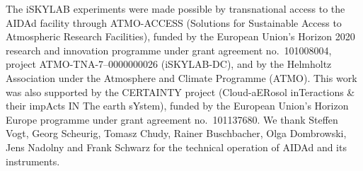 \begin{acknowledgements}
The iSKYLAB experiments were made possible by transnational access to the AIDAd facility through ATMO-ACCESS (Solutions for Sustainable Access to Atmospheric Research Facilities), funded by the European Union's Horizon 2020 research and innovation programme under grant agreement no.~101008004, project ATMO-TNA-7--0000000026 (iSKYLAB-DC), and by the Helmholtz Association under the Atmosphere and Climate Programme (ATMO). This work was also supported by the CERTAINTY project (Cloud-aERosol inTeractions \& their impActs IN The earth sYstem), funded by the European Union's Horizon Europe programme under grant agreement no.~101137680. We thank Steffen Vogt, Georg Scheurig, Tomasz Chudy, Rainer Buschbacher, Olga Dombrowski, Jens Nadolny and Frank Schwarz for the technical operation of AIDAd and its instruments. 
\end{acknowledgements}



